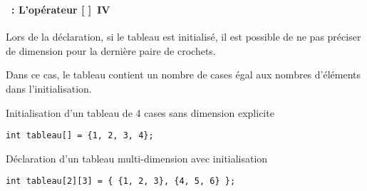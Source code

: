 \begin{frame}[containsverbatim]
  \frametitle{\secname}
  \framesubtitle{\subsecname~: L'opérateur [ ]~IV}

  Lors de la déclaration, si le tableau est initialisé, il est possible de ne pas préciser de dimension pour la dernière paire de
  crochets.
  \vspace{0.5cm}
  \par
  Dans ce cas, le tableau contient un nombre de cases égal aux nombres d'éléments dans l'initialisation.
  \vspace{0.5cm}
  \begin{exampleblock}{Initialisation d'un tableau de 4 cases sans dimension explicite}
    \begin{verbatim}
int tableau[] = {1, 2, 3, 4};\end{verbatim}
  \end{exampleblock}

  \begin{exampleblock}{Déclaration d'un tableau multi-dimension avec initialisation}
    \begin{verbatim}
int tableau[2][3] = { {1, 2, 3}, {4, 5, 6} };\end{verbatim}
  \end{exampleblock}
\end{frame}

